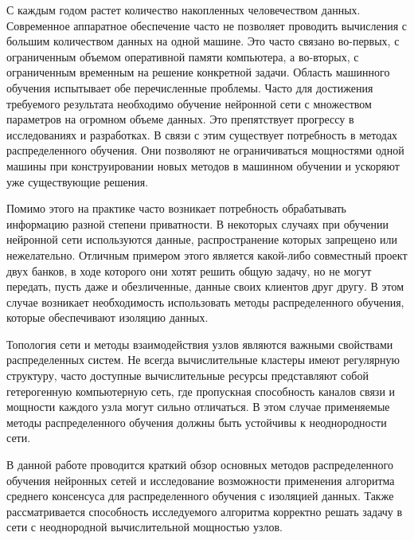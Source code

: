 \documentclass[a4paper,article,14pt]{extarticle}
\begin{document}


\tableofcontents
\pagebreak

С каждым годом растет количество
накопленных человечеством данных. Современное аппаратное обеспечение часто не позволяет проводить вычисления
с большим количеством данных на одной машине. Это часто связано во-первых, с ограниченным объемом оперативной памяти компьютера,
а во-вторых, с ограниченным временным на решение конкретной задачи. Область машинного обучения испытывает обе перечисленные проблемы.
Часто для достижения требуемого результата необходимо обучение нейронной сети с множеством параметров на огромном объеме данных.
Это препятствует прогрессу в исследованиях и разработках.  В связи с этим существует потребность в методах распределенного обучения.
Они позволяют не ограничиваться мощностями одной машины при конструировании новых методов в машинном обучении
и ускоряют уже существующие решения.

Помимо этого на практике часто возникает потребность обрабатывать информацию разной степени приватности. В некоторых случаях
при обучении нейронной сети используются данные, распространение которых запрещено или нежелательно. Отличным примером этого
является какой-либо совместный проект двух банков, в ходе которого они хотят решить общую задачу, но не могут передать, пусть даже
и обезличенные, данные своих клиентов друг другу. В этом случае возникает необходимость использовать методы распределенного обучения, которые
обеспечивают изоляцию данных.

Топология сети и методы взаимодействия узлов являются важными свойствами распределенных систем. Не всегда вычислительные
кластеры имеют регулярную структуру, часто доступные вычислительные ресурсы представляют собой гетерогенную компьютерную сеть,
где пропускная способность каналов связи и мощности каждого узла могут сильно отличаться. В этом случае применяемые методы распределенного
обучения должны быть устойчивы к неоднородности сети.

В данной работе проводится краткий обзор основных методов распределенного обучения нейронных сетей и исследование
возможности применения алгоритма среднего консенсуса для распределенного обучения с изоляцией данных. Также рассматривается
способность исследуемого алгоритма корректно решать задачу в сети с неоднородной вычислительной мощностью узлов.

\end{document}
